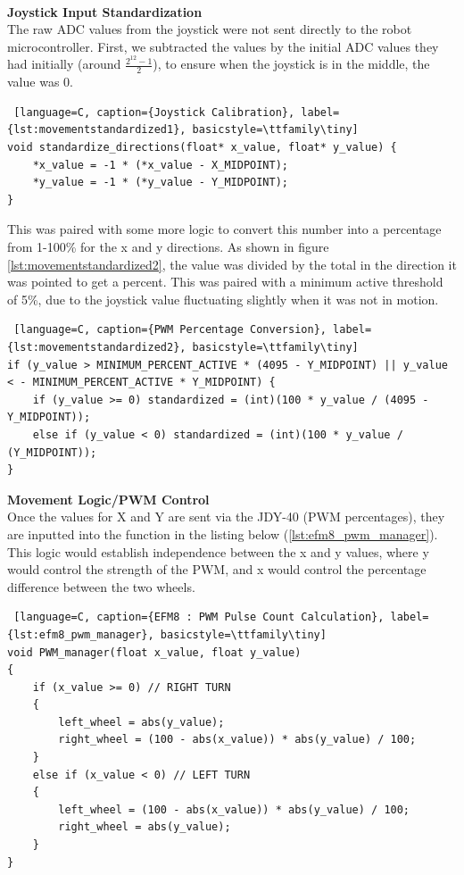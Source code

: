 \documentclass{article}
\begin{document}
\

\textbf{Joystick Input Standardization} \\
The raw ADC values from the joystick were not sent directly to the robot microcontroller. First, we subtracted the values by the initial ADC values they had initially (around $\frac{2^{12}-1}{2}$), to ensure when the joystick is in the middle, the value was 0.

\begin{lstlisting} [language=C, caption={Joystick Calibration}, label={lst:movementstandardized1}, basicstyle=\ttfamily\tiny]
void standardize_directions(float* x_value, float* y_value) {
    *x_value = -1 * (*x_value - X_MIDPOINT);
    *y_value = -1 * (*y_value - Y_MIDPOINT);
}
\end{lstlisting}

This was paired with some more logic to convert this number into a percentage from 1-100\% for the x and y directions. As shown in figure \ref{lst:movementstandardized2}, the value was divided by the total in the direction it was pointed to get a percent. This was paired with a minimum
 active threshold of 5\%, due to the joystick value fluctuating slightly when it was not in motion.
\begin{lstlisting} [language=C, caption={PWM Percentage Conversion}, label={lst:movementstandardized2}, basicstyle=\ttfamily\tiny]
if (y_value > MINIMUM_PERCENT_ACTIVE * (4095 - Y_MIDPOINT) || y_value < - MINIMUM_PERCENT_ACTIVE * Y_MIDPOINT) {
    if (y_value >= 0) standardized = (int)(100 * y_value / (4095 - Y_MIDPOINT));
    else if (y_value < 0) standardized = (int)(100 * y_value / (Y_MIDPOINT));
}
\end{lstlisting}

\textbf{Movement Logic/PWM Control} \\
Once the values for X and Y are sent via the JDY-40 (PWM percentages), they are inputted into the function in the listing below (\ref{lst:efm8_pwm_manager}). This logic would establish independence between the x and y values, where y would control the strength of the PWM, and x would control the percentage difference between the two wheels.

\begin{lstlisting} [language=C, caption={EFM8 : PWM Pulse Count Calculation}, label={lst:efm8_pwm_manager}, basicstyle=\ttfamily\tiny]
void PWM_manager(float x_value, float y_value)
{
    if (x_value >= 0) // RIGHT TURN
    {
        left_wheel = abs(y_value);
        right_wheel = (100 - abs(x_value)) * abs(y_value) / 100;
    }
    else if (x_value < 0) // LEFT TURN
    {
        left_wheel = (100 - abs(x_value)) * abs(y_value) / 100;
        right_wheel = abs(y_value);
    }
}
\end{lstlisting}
\end{document}
